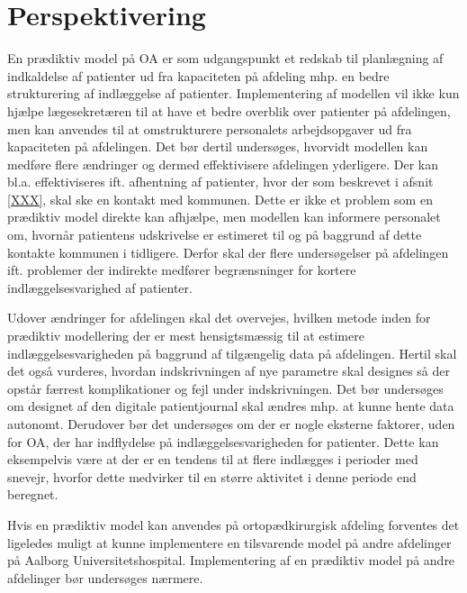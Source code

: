 \section{Perspektivering} 
En prædiktiv model på OA er som udgangspunkt et redskab til planlægning af indkaldelse af patienter ud fra kapaciteten på afdeling mhp. en bedre strukturering af indlæggelse af patienter. Implementering af modellen vil ikke kun hjælpe lægesekretæren til at have et bedre overblik over patienter på afdelingen, men kan anvendes til at omstrukturere personalets arbejdsopgaver ud fra kapaciteten på afdelingen. Det bør dertil undersøges, hvorvidt modellen kan medføre flere ændringer og dermed effektivisere afdelingen yderligere. Der kan bl.a. effektiviseres ift. afhentning af patienter, hvor der som beskrevet i afsnit \ref{XXX}, skal ske en kontakt med kommunen. Dette er ikke et problem som en prædiktiv model direkte kan afhjælpe, men modellen kan informere personalet om, hvornår patientens udskrivelse er estimeret til og på baggrund af dette kontakte kommunen i tidligere. Derfor skal der flere undersøgelser på afdelingen ift. problemer der indirekte medfører begrænsninger for kortere indlæggelsesvarighed af patienter.


Udover ændringer for afdelingen skal det overvejes, hvilken metode inden for prædiktiv modellering der er mest hensigtsmæssig til at estimere indlæggelsesvarigheden på baggrund af tilgængelig data på afdelingen. Hertil skal det også vurderes, hvordan indskrivningen af nye parametre skal designes så der opstår færrest komplikationer og fejl under indskrivningen. Det bør undersøges om designet af den digitale patientjournal skal ændres mhp. at kunne hente data autonomt. Derudover bør det undersøges om der er nogle eksterne faktorer, uden for OA, der har indflydelse på indlæggelsesvarigheden for patienter. Dette kan eksempelvis være at der er en tendens til at flere indlægges i perioder med snevejr, hvorfor dette medvirker til en større aktivitet i denne periode end beregnet.


Hvis en prædiktiv model kan anvendes på ortopædkirurgisk afdeling forventes det ligeledes muligt at kunne implementere en tilsvarende model på andre afdelinger på Aalborg Universitetshospital. Implementering af en prædiktiv model på andre afdelinger bør undersøges nærmere. 
